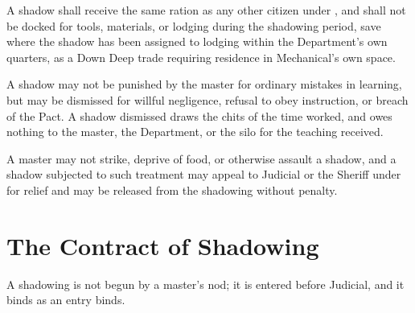 \begin{clauses}
\item A shadow shall receive the same ration as any other citizen under , and shall not be docked for tools, materials, or lodging during the shadowing period, save where the shadow has been assigned to lodging within the Department's own quarters, as a Down Deep trade requiring residence in Mechanical's own space.
\item A shadow may not be punished by the master for ordinary mistakes in learning, but may be dismissed for willful negligence, refusal to obey instruction, or breach of the Pact. A shadow dismissed draws the chits of the time worked, and owes nothing to the master, the Department, or the silo for the teaching received.
\item A master may not strike, deprive of food, or otherwise assault a shadow, and a shadow subjected to such treatment may appeal to Judicial or the Sheriff under  for relief and may be released from the shadowing without penalty.
\end{clauses}

\section{The Contract of Shadowing}
\label{sec:labor:contract-of-shadowing}

A shadowing is not begun by a master's nod; it is entered before Judicial, and it binds as an entry binds.

